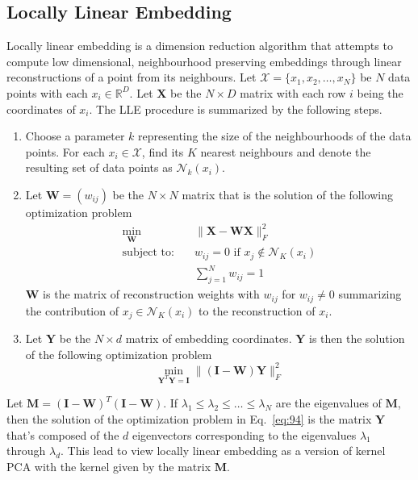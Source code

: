 \subsection{Locally Linear Embedding}
\label{sec:locally-line-embedd}
Locally linear embedding \citep{roweis00:_nonlin} is a dimension 
reduction algorithm that attempts to compute low dimensional,
neighbourhood preserving embeddings through linear reconstructions of a
point from its neighbours. Let $\mathcal{X} = \{x_1,x_2, \dots, x_N\}$
be $N$ data points with each $x_i \in \mathbb{R}^{D}$. Let
$\mathbf{X}$ be the $N \times D$ matrix with each row $i$ being the
coordinates of $x_i$. The LLE procedure is summarized by the following steps.
\begin{enumerate}
\item Choose a parameter $k$ representing the size of the
  neighbourhoods of the data points. For each $x_i \in \mathcal{X}$,
  find its $K$ nearest neighbours and denote the resulting set of data
  points as $\mathcal{N}_k(x_i)$.
\item Let $\mathbf{W} = (w_{ij})$ be the $N \times N$ matrix that is
  the solution of the following optimization problem
  \begin{align*}
    \min_{\mathbf{W}} & \quad \| \mathbf{X} - \mathbf{W}\mathbf{X} \|_F^{2} \\
    \text{subject to:} & \quad w_{ij} = 0 \,\, \text{if $x_j \not \in
      \mathcal{N}_K(x_i)$} \\
    & \quad \sum_{j=1}^{N}{w_{ij}} = 1
  \end{align*}
  $\mathbf{W}$ is the matrix of reconstruction weights with $w_{ij}$
  for $w_{ij} \not = 0$ summarizing the contribution of $x_j \in
  \mathcal{N}_K(x_i)$ to the reconstruction of $x_i$.
\item Let $\mathbf{Y}$ be the $N \times d$ matrix of embedding
  coordinates. $\mathbf{Y}$ is then the solution of the following
  optimization problem
  \begin{equation}
    \label{eq:94}
    \min_{\mathbf{Y}^{T}\mathbf{Y} =
      \mathbf{I}}\|(\mathbf{I} - \mathbf{W})\mathbf{Y}\|_{F}^{2}
  \end{equation}
\end{enumerate}
Let $\mathbf{M} = (\mathbf{I} - \mathbf{W})^{T}(\mathbf{I} -
\mathbf{W})$. If $\lambda_1 \leq \lambda_2 \leq \dots \leq \lambda_N$
are the eigenvalues of $\mathbf{M}$, then the solution of the
optimization problem in Eq.~\eqref{eq:94} is the matrix $\mathbf{Y}$
that's composed of the $d$ eigenvectors corresponding to the
eigenvalues $\lambda_1$ through $\lambda_{d}$. This lead \citet{ham04}
to view locally linear embedding as a version of kernel PCA
\citep{scholkopf97:_lectur_notes_comput_scien} with the kernel given
by the matrix $\mathbf{M}$.
%
%
